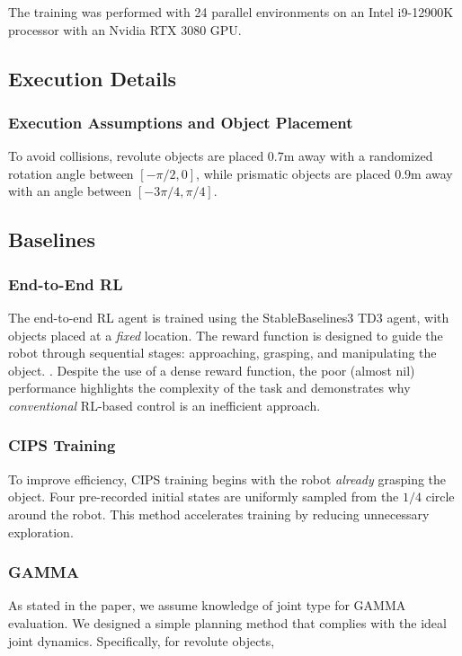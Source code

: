 The training was performed with 24 parallel environments on an Intel i9-12900K processor with an Nvidia RTX 3080 GPU.

\subsection{Execution Details}

\subsubsection{Execution Assumptions and Object Placement}
To avoid collisions, revolute objects are placed $0.7$m away with a randomized rotation angle between \([- \pi/2, 0]\), while prismatic objects are placed $0.9$m away with an angle between \([-3\pi/4, \pi/4]\).

\subsection{Baselines}

\subsubsection{End-to-End RL}
The end-to-end RL agent is trained using the StableBaselines3 TD3 agent, with objects placed at a \textit{fixed} location. The reward function is designed to guide the robot through sequential stages: approaching, grasping, and manipulating the object. . Despite the use of a dense reward function, the poor (almost nil) performance highlights the complexity of the task and demonstrates why \textit{conventional} RL-based control is an inefficient approach.


\subsubsection{CIPS Training}
To improve efficiency, CIPS training begins with the robot \textit{already} grasping the object. Four pre-recorded initial states are uniformly sampled from the $1/4$ circle around the robot. This method accelerates training by reducing unnecessary exploration.
\subsubsection{GAMMA}
As stated in the paper, we assume knowledge of joint type for GAMMA evaluation. We designed a simple planning method that complies with the ideal joint dynamics. Specifically, for revolute objects, 


